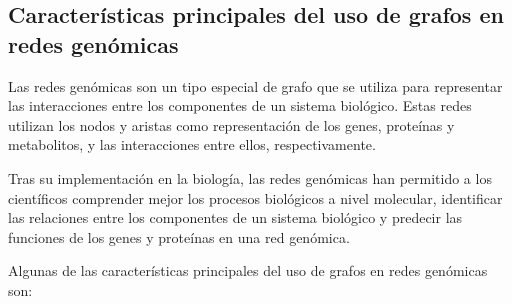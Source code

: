 \documentclass[11pt, a4paper]{article}
\begin{document}
  \subsection{Características principales del uso de grafos en redes genómicas}

  Las redes genómicas son un tipo especial de grafo que se utiliza para representar las interacciones entre los componentes de un sistema biológico. Estas redes utilizan los nodos y aristas como representación de los genes, proteínas y metabolitos, y las interacciones entre ellos, respectivamente.
  
  Tras su implementación en la biología, las redes genómicas han permitido a los científicos comprender mejor los procesos biológicos a nivel molecular, identificar las relaciones entre los componentes de un sistema biológico y predecir las funciones de los genes y proteínas en una red genómica.

  Algunas de las características principales del uso de grafos en redes genómicas son:
\end{document}

